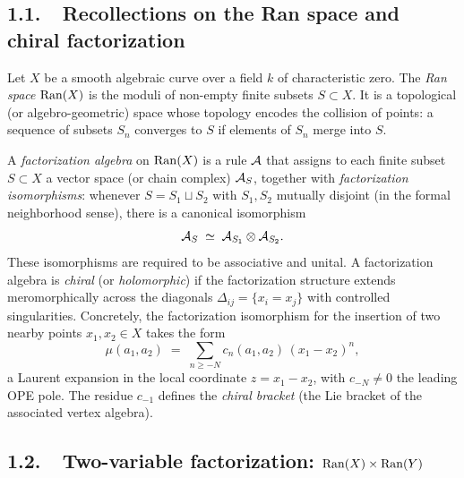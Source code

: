 \subsection*{1.1.\ \ Recollections on the Ran space and chiral factorization}

Let $X$ be a smooth algebraic curve over a field $k$ of characteristic zero.
The \emph{Ran space} $\mathrm{Ran}(X)$ is the moduli of non-empty finite subsets
$S \subset X$. It is a topological (or algebro-geometric) space whose
topology encodes the collision of points: a sequence of subsets $S_n$
converges to $S$ if elements of $S_n$ merge into $S$.

A \emph{factorization algebra} on $\mathrm{Ran}(X)$ is a rule $\mathcal{A}$ that assigns to
each finite subset $S \subset X$ a vector space (or chain complex)
$\mathcal{A}_S$, together with \emph{factorization isomorphisms}: whenever
$S = S_1 \sqcup S_2$ with $S_1, S_2$ mutually disjoint (in the formal
neighborhood sense), there is a canonical isomorphism
\[
 \mathcal{A}_S \;\simeq\; \mathcal{A}_{S_1} \otimes \mathcal{A}_{S_2}.
\]
These isomorphisms are required to be associative and unital.
A factorization algebra is \emph{chiral} (or \emph{holomorphic}) if the
factorization structure extends meromorphically across the diagonals
$\Delta_{ij} = \{x_i = x_j\}$ with controlled singularities. Concretely,
the factorization isomorphism for the insertion of two nearby points
$x_1, x_2 \in X$ takes the form
\[
 \mu(a_1, a_2) \;=\; \sum_{n \geq -N} c_n(a_1, a_2)\,(x_1 - x_2)^n,
\]
a Laurent expansion in the local coordinate $z = x_1 - x_2$, with
$c_{-N} \neq 0$ the leading OPE pole. The residue $c_{-1}$ defines the
\emph{chiral bracket} (the Lie bracket of the associated vertex algebra).

\subsection*{1.2.\ \ Two-variable factorization:
 $\mathrm{Ran}(X) \times \mathrm{Ran}(Y)$}

